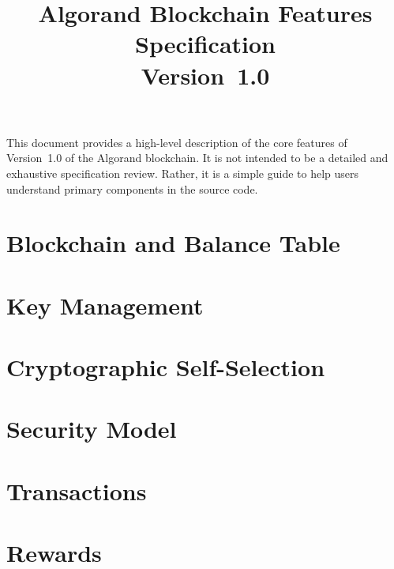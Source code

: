 \documentclass{article}
\title{Algorand Blockchain Features Specification\\ Version~1.0}
\begin{document}
\maketitle

This document provides a high-level description of the core features of Version~1.0 of the Algorand blockchain.  It is not intended to be a detailed and exhaustive specification review. Rather, it is a simple guide to help users understand primary components in the source code.

\setcounter{tocdepth}{1}
\tableofcontents

\section{Blockchain and Balance Table}\label{section:Blockchain}




\section{Key Management}\label{section:KeyManagement}


\section{Cryptographic Self-Selection}\label{section:CryptographicSelfSelection}


\section{Security Model}
\label{section:SecurityModel}


\section{Transactions}
\label{section:Transactions}


\section{Rewards}
\label{section:Rewards}

\end{document}
